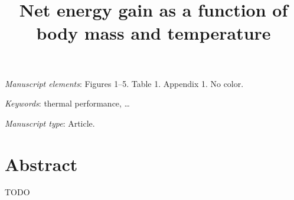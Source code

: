 \documentclass[11pt]{article}
\begin{document}


\title{Net energy gain as a function of body mass and temperature}


\date{}

\maketitle

\bigskip

\noindent
\textit{Manuscript elements}:
Figures 1--5.
Table 1.
Appendix 1. %
No color.

\bigskip

\noindent
\textit{Keywords}:
thermal performance, \ldots

\bigskip

\noindent
\textit{Manuscript type}:
Article.

\vfill


\newpage


\linenumbers{}

\section*{Abstract}

TODO

\newpage

\end{document}
